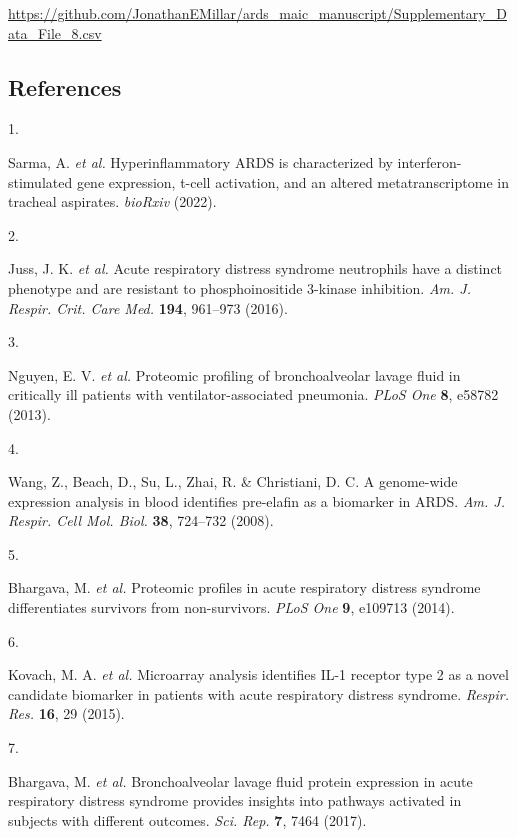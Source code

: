 \documentclass[
  11,
  a4paper,
]{article}
\newlength{\cslhangindent}
\newlength{\csllabelwidth}
\newlength{\cslentryspacingunit} %
\newenvironment{CSLReferences}[2] %
 {%
  \setlength{\parindent}{0pt}
  \ifodd #1
  \let\oldpar\par
  \def\par{\hangindent=\cslhangindent\oldpar}
  \fi
  \setlength{\parskip}{#2\cslentryspacingunit}
 }%
 {}
\newcommand{\CSLLeftMargin}[1]{\parbox[t]{\csllabelwidth}{#1}}
\newcommand{\CSLRightInline}[1]{\parbox[t]{\linewidth - \csllabelwidth}{#1}\break}
\begin{document}
\url{https://github.com/JonathanEMillar/ards_maic_manuscript/Supplementary_Data_File_8.csv}

\newpage

\hypertarget{references}{%
\subsection{References}\label{references}}

\hypertarget{refs}{}
\begin{CSLReferences}{0}{0}
\leavevmode{}%
\CSLLeftMargin{1. }%
\CSLRightInline{Sarma, A. \emph{et al.} Hyperinflammatory {ARDS} is
characterized by interferon-stimulated gene expression, t-cell
activation, and an altered metatranscriptome in tracheal aspirates.
\emph{bioRxiv} (2022).}

\leavevmode{}%
\CSLLeftMargin{2. }%
\CSLRightInline{Juss, J. K. \emph{et al.} Acute respiratory distress
syndrome neutrophils have a distinct phenotype and are resistant to
phosphoinositide 3-kinase inhibition. \emph{Am. J. Respir. Crit. Care
Med.} \textbf{194}, 961--973 (2016).}

\leavevmode{}%
\CSLLeftMargin{3. }%
\CSLRightInline{Nguyen, E. V. \emph{et al.} Proteomic profiling of
bronchoalveolar lavage fluid in critically ill patients with
ventilator-associated pneumonia. \emph{PLoS One} \textbf{8}, e58782
(2013).}

\leavevmode{}%
\CSLLeftMargin{4. }%
\CSLRightInline{Wang, Z., Beach, D., Su, L., Zhai, R. \& Christiani, D.
C. A genome-wide expression analysis in blood identifies pre-elafin as a
biomarker in {ARDS}. \emph{Am. J. Respir. Cell Mol. Biol.} \textbf{38},
724--732 (2008).}

\leavevmode{}%
\CSLLeftMargin{5. }%
\CSLRightInline{Bhargava, M. \emph{et al.} Proteomic profiles in acute
respiratory distress syndrome differentiates survivors from
non-survivors. \emph{PLoS One} \textbf{9}, e109713 (2014).}

\leavevmode{}%
\CSLLeftMargin{6. }%
\CSLRightInline{Kovach, M. A. \emph{et al.} Microarray analysis
identifies {IL-1} receptor type 2 as a novel candidate biomarker in
patients with acute respiratory distress syndrome. \emph{Respir. Res.}
\textbf{16}, 29 (2015).}

\leavevmode{}%
\CSLLeftMargin{7. }%
\CSLRightInline{Bhargava, M. \emph{et al.} Bronchoalveolar lavage fluid
protein expression in acute respiratory distress syndrome provides
insights into pathways activated in subjects with different outcomes.
\emph{Sci. Rep.} \textbf{7}, 7464 (2017).}


\end{CSLReferences}
\end{document}
